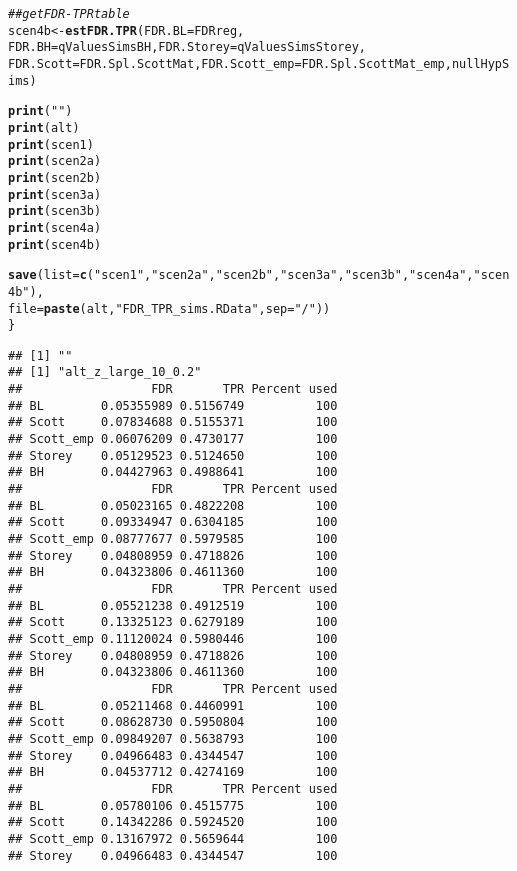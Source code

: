 \documentclass{article}\usepackage[]{graphicx}\usepackage[]{color}
\makeatletter
\newcommand{\hlstr}[1]{\textcolor[rgb]{0.192,0.494,0.8}{#1}}%
\newcommand{\hlcom}[1]{\textcolor[rgb]{0.678,0.584,0.686}{\textit{#1}}}%
\newcommand{\hlstd}[1]{\textcolor[rgb]{0.345,0.345,0.345}{#1}}%
\newcommand{\hlkwb}[1]{\textcolor[rgb]{0.69,0.353,0.396}{#1}}%
\newcommand{\hlkwc}[1]{\textcolor[rgb]{0.333,0.667,0.333}{#1}}%
\newcommand{\hlkwd}[1]{\textcolor[rgb]{0.737,0.353,0.396}{\textbf{#1}}}%
\newenvironment{kframe}{%
 \def\at@end@of@kframe{}%
 \ifinner\ifhmode%
  \def\at@end@of@kframe{\end{minipage}}%
  \begin{minipage}{\columnwidth}%
 \fi\fi%
 \def\FrameCommand##1{\hskip\@totalleftmargin \hskip-\fboxsep
 \colorbox{shadecolor}{##1}\hskip-\fboxsep
     \hskip-\linewidth \hskip-\@totalleftmargin \hskip\columnwidth}%
 \MakeFramed {\advance\hsize-\width
   \@totalleftmargin\z@ \linewidth\hsize
   \@setminipage}}%
 {\par\unskip\endMakeFramed%
 \at@end@of@kframe}
\newenvironment{knitrout}{}{} %
\makeatother
\begin{document}
\begin{knitrout}
\begin{kframe}
\begin{alltt}
  \hlcom{##get FDR-TPR table}
  \hlstd{scen4b} \hlkwb{<-} \hlkwd{estFDR.TPR}\hlstd{(}\hlkwc{FDR.BL} \hlstd{= FDRreg,}
                       \hlkwc{FDR.BH} \hlstd{= qValuesSimsBH,} \hlkwc{FDR.Storey} \hlstd{= qValuesSimsStorey,}
                       \hlkwc{FDR.Scott} \hlstd{= FDR.Spl.ScottMat,} \hlkwc{FDR.Scott_emp} \hlstd{= FDR.Spl.ScottMat_emp, nullHypSims)}

  \hlkwd{print}\hlstd{(}\hlstr{""}\hlstd{)}
  \hlkwd{print}\hlstd{(alt)}
  \hlkwd{print}\hlstd{(scen1)}
  \hlkwd{print}\hlstd{(scen2a)}
  \hlkwd{print}\hlstd{(scen2b)}
  \hlkwd{print}\hlstd{(scen3a)}
  \hlkwd{print}\hlstd{(scen3b)}
  \hlkwd{print}\hlstd{(scen4a)}
  \hlkwd{print}\hlstd{(scen4b)}

  \hlkwd{save}\hlstd{(}\hlkwc{list}\hlstd{=}\hlkwd{c}\hlstd{(}\hlstr{"scen1"}\hlstd{,}\hlstr{"scen2a"}\hlstd{,}\hlstr{"scen2b"}\hlstd{,}\hlstr{"scen3a"}\hlstd{,}\hlstr{"scen3b"}\hlstd{,}\hlstr{"scen4a"}\hlstd{,}\hlstr{"scen4b"}\hlstd{),}
       \hlkwc{file}\hlstd{=}\hlkwd{paste}\hlstd{(alt,}\hlstr{"FDR_TPR_sims.RData"}\hlstd{,}\hlkwc{sep}\hlstd{=}\hlstr{"/"}\hlstd{))}
\hlstd{\}}
\end{alltt}
\begin{verbatim}
## [1] ""
## [1] "alt_z_large_10_0.2"
##                  FDR       TPR Percent used
## BL        0.05355989 0.5156749          100
## Scott     0.07834688 0.5155371          100
## Scott_emp 0.06076209 0.4730177          100
## Storey    0.05129523 0.5124650          100
## BH        0.04427963 0.4988641          100
##                  FDR       TPR Percent used
## BL        0.05023165 0.4822208          100
## Scott     0.09334947 0.6304185          100
## Scott_emp 0.08777677 0.5979585          100
## Storey    0.04808959 0.4718826          100
## BH        0.04323806 0.4611360          100
##                  FDR       TPR Percent used
## BL        0.05521238 0.4912519          100
## Scott     0.13325123 0.6279189          100
## Scott_emp 0.11120024 0.5980446          100
## Storey    0.04808959 0.4718826          100
## BH        0.04323806 0.4611360          100
##                  FDR       TPR Percent used
## BL        0.05211468 0.4460991          100
## Scott     0.08628730 0.5950804          100
## Scott_emp 0.09849207 0.5638793          100
## Storey    0.04966483 0.4344547          100
## BH        0.04537712 0.4274169          100
##                  FDR       TPR Percent used
## BL        0.05780106 0.4515775          100
## Scott     0.14342286 0.5924520          100
## Scott_emp 0.13167972 0.5659644          100
## Storey    0.04966483 0.4344547          100

\end{verbatim}
\end{kframe}
\end{knitrout}
\end{document}
